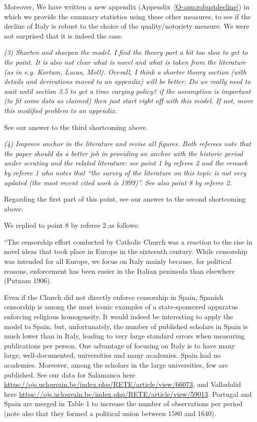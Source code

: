 \documentclass[12pt]{article}
\begin{document}
Moreover, We have written a new appendix (Appendix~\ref{O-app:robustdecline}) in which we provide the summary statistics using these other measures, to see if the decline of Italy is robust to the choice of the quality/notoriety measure. We were not surprised that it is indeed the case.


\textit{
(3) Shorten and sharpen the model. I find the theory part a bit too slow to get to the
point. It is also not clear what is novel and what is taken from the literature (as in
e.g. Kortum, Lucas, Moll). Overall, I think a shorter theory section (with details
and derivations moved to an appendix) will be better.
Do we really need to wait until section 3.5 to get a time varying policy? if the
assumption is important (to fit some data as claimed) then just start right off with
this model. If not, move this modified problem to an appendix.}

See our answer to the third shortcoming above.

\textit{
(4) Improve anchor in the literature and revise all figures. Both referees note that
the paper should do a better job in providing an anchor with the historic period
under scrutiny and the related literature: see point 1 by referee 2 and the remark
by referee 1 who notes that “the survey of the literature on this topic is not very
updated (the most recent cited work is 1999)”. See also point 8 by referee 2.}


Regarding the first part of this point, see our answer to the second shortcoming above.

We replied to point 8 by referee 2 as follows: 

``The censorship effort conducted by Catholic Church was a reaction to the rise in novel ideas that took place in Europe in the sixteenth century. While censorship was intended for all Europe, we focus on Italy mainly because, for political reasons, enforcement has been easier in the Italian peninsula than elsewhere (Putnam 1906). 

Even if the Church did not directly enforce censorship in Spain, Spanish censorship is among the most iconic examples of a state-sponsored apparatus enforcing religious homogeneity. It would indeed be interesting to apply the model to Spain, but, unfortunately, the number of published scholars in Spain is much lower than in Italy, leading to very large standard errors when measuring publications per person. One advantage of focusing on Italy is to have many large, well-documented, universities and many academies. Spain had no academies. Moreover, among the scholars in the large universities, few are published. See our data for Salamanca here  \url{https://ojs.uclouvain.be/index.php/RETE/article/view/66073}, and Valladolid here
\url{https://ojs.uclouvain.be/index.php/RETE/article/view/59013}. Portugal and Spain are merged in Table 1 to increase the number of observations per period (note also that they formed a political union between 1580 and 1640).
\end{document}
